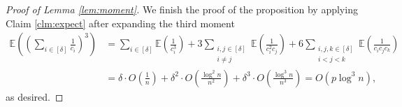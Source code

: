\documentclass{article}
\begin{document}
\begin{proof}[Proof of Lemma \ref{lem:moment}]
We finish the proof of the proposition by applying Claim \ref{clm:expect} after expanding the third moment
\begin{align*}
	\mathbb E \left(\left(\sum_{i \in [\delta]}\frac{1}{c_{i}} \right)^3 \right) &= \sum_{i \in [\delta]} \mathbb E\left(\frac{1}{c_{i}^3} \right) + 3\sum_{\substack{i, j \in [\delta] \\ i \neq j}} \mathbb E \left(\frac{1}{c_{i}^2 c_{j}} \right) + 6\sum_{\substack{i,j,k \in [\delta] \\ i<j<k}} \mathbb E \left(\frac{1}{c_{i} c_{j} c_{k}} \right)\\
  &=\delta \cdot O\left(\frac{1}{n} \right) + \delta^2 \cdot O\left(\frac{\log^2 n}{n^2} \right) + \delta^3 \cdot O\left(\frac{\log^3 n}{n^3} \right) = O\left(p \log^3 n \right),
 \end{align*}
 as desired.
\end{proof}
	
\end{document}
